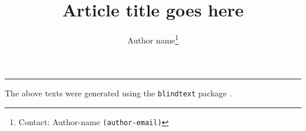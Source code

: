 \documentclass[12pt,letterpaper]{article}   %
\def\TitleFont{\Large}                      %
\def\MainTextSpacing{\singlespacing}        %
\def\BibTextSpacing{\singlespacing}         %
\numberwithin{equation}{section}        %
\theoremstyle{definition}
\begin{document}
\MainTextSpacing                            %
\setcounter{page}{1}                        %


\title{\vspace{-\baselineskip}\TitleFont{Article title goes here}}
\author[]{Author name\footnote{Contact: Author-name \texttt{(author-email)}}} 
\date{}                                     %
\maketitle
\vspace{-\baselineskip} \hrule


\blinddocument

The above texts were generated using the \texttt{blindtext} package \cite{dirac}.


\BibTextSpacing                         %
\fancyhead[L]{\nouppercase \leftmark}
\printbibliography[title={Bibliographic references},
    heading=bibintoc,notcategory=mypapers]
\clearpage                              %
\end{document}
